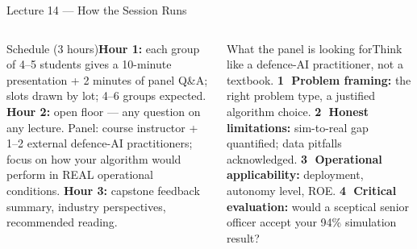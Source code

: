 \documentclass[aspectratio=169,10pt,t]{beamer}
\begin{document}

\begin{frame}{Lecture 14 --- How the Session Runs}
\begin{columns}[T]
\begin{cbox}{Schedule (3 hours)}\scriptsize\textbf{Hour 1:} each group of 4--5 students gives a 10-minute presentation + 2 minutes of panel Q\&A; slots drawn by lot; 4--6 groups expected. \textbf{Hour 2:} open floor --- any question on any lecture. Panel: course instructor + 1--2 external defence-AI practitioners; focus on how your algorithm would perform in REAL operational conditions. \textbf{Hour 3:} capstone feedback summary, industry perspectives, recommended reading.\end{cbox}
\begin{cbox}[AccentCol]{What the panel is looking for}\scriptsize Think like a defence-AI practitioner, not a textbook. \textbf{\textcircled{\tiny1} Problem framing:} the right problem type, a justified algorithm choice. \textbf{\textcircled{\tiny2} Honest limitations:} sim-to-real gap quantified; data pitfalls acknowledged. \textbf{\textcircled{\tiny3} Operational applicability:} deployment, autonomy level, ROE. \textbf{\textcircled{\tiny4} Critical evaluation:} would a sceptical senior officer accept your 94\% simulation result?\end{cbox}
\end{columns}
\end{frame}
\end{document}

